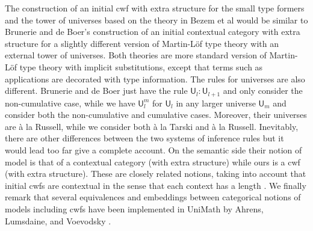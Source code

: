 \documentclass[11pt,a4paper]{article}
\theoremstyle{definition}
\newcommand{\UU}{\mathsf{U}}
\def\UU{\mathsf{U}}
\newcommand{\T}{\mathsf{T}}
\def\T{\mathcal{T}}
\newcommand{\Ta}{\mathrm{T}}
\def\CwF{\mathrm{CwF}}
\begin{document}
The construction of an initial cwf with extra structure for the small type formers and the tower of universes based on the theory in Bezem et al \cite{BezemCDE22} would be similar to Brunerie and de Boer's \cite{Brunerie:initiality,deBoer:lic} construction of an initial contextual category with extra structure for a slightly different version of Martin-Löf type theory with an external tower of universes. Both theories are more standard version of Martin-Löf type theory with implicit substitutions, except that terms such as applications are decorated with type information. The rules for universes are also different. Brunerie and de Boer just have the rule $\UU_l : \UU_{l+1}$ and only consider the non-cumulative case, while we have $\UU_l^m$ for $\UU_l$ in any larger universe $\UU_m$ and consider both the non-cumulative and cumulative cases.
Moreover, their universes are \`a la Russell, while we consider both \`a la Tarski and \`a la Russell. Inevitably, there are other differences between the two systems of inference rules but it would lead too far give a complete account. On the semantic side their notion of model is that of a contextual category (with extra structure) while ours is a cwf (with extra structure). These are closely related notions, taking into account that initial cwfs are contextual in the sense that each context has a length \cite{ClairambaultD11,ClairambaultD14}. We finally remark that several equivalences and embeddings between categorical notions of models including cwfs have been implemented in UniMath by Ahrens, Lumsdaine, and Voevodsky \cite{AhrensLV18}.


%
%
\end{document}
